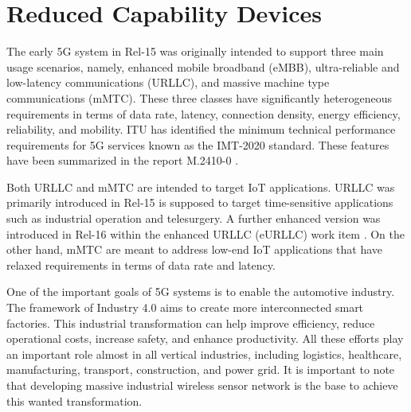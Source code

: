 \documentclass[conference]{IEEEtran}
\begin{document}
\section{Reduced Capability Devices}
\label{sec:3-RedCap-Intro}



The early 5G system in Rel-15 was originally intended to support three main usage scenarios, namely, enhanced mobile broadband (eMBB), ultra-reliable and low-latency communications (URLLC), and massive machine type communications (mMTC). These three classes have significantly heterogeneous requirements in terms of data rate, latency, connection density, energy efficiency, reliability, and mobility. ITU has identified the minimum technical performance requirements for 5G services known as the IMT-2020 standard. These features have been summarized in the report M.2410-0 \cite{itu-r_minimum_2017_M.2410-0}.

 Both URLLC and mMTC are intended to target IoT applications. URLLC was primarily introduced in Rel-15 is supposed to target time-sensitive applications such as industrial operation and telesurgery. A further enhanced version was introduced in Rel-16 within the enhanced URLLC (eURLLC) work item \cite{3gpp_study_nodate_38.824}. On the other hand, mMTC are meant to address low-end IoT applications that have relaxed requirements in terms of data rate and latency.

One of the important goals of 5G systems is to enable the automotive industry. The framework of Industry 4.0 aims to create more interconnected smart factories. This industrial transformation can help improve efficiency, reduce operational costs, increase safety, and enhance productivity. All these efforts play an important role almost in all vertical industries, including logistics, healthcare, manufacturing, transport, construction, and power grid. It is important to note that developing massive industrial wireless sensor network is the base to achieve this wanted transformation. 
\end{document}
